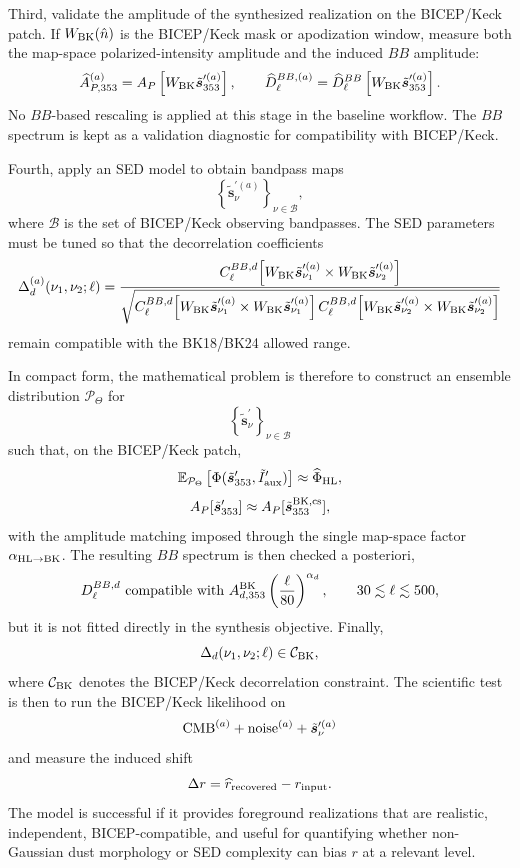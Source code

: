 \documentclass[11pt]{article}
\begin{document}
Third, validate the amplitude of the synthesized realization on the
BICEP/Keck patch.  If $W_{\rm BK}(\hat n)$ is the BICEP/Keck mask or
apodization window, measure both the map-space polarized-intensity amplitude
and the induced $BB$ amplitude:
\[
  \widehat A_{P,353}^{(a)}
  =
  A_P
  \left[
    W_{\rm BK}\tilde{\bm s}_{353}^{\prime(a)}
  \right],
  \qquad
  \widehat D_\ell^{BB,(a)}
  =
  \widehat D_\ell^{BB}
  \left[
    W_{\rm BK}\tilde{\bm s}_{353}^{\prime(a)}
  \right].
\]
No $BB$-based rescaling is applied at this stage in the baseline workflow.
The $BB$ spectrum is kept as a validation diagnostic for compatibility with
BICEP/Keck.

Fourth, apply an SED model to obtain bandpass maps
\[
  \left\{
    \tilde{\bm s}_{\nu}^{\prime(a)}
  \right\}_{\nu\in\mathcal B},
\]
where $\mathcal B$ is the set of BICEP/Keck observing bandpasses.  The SED
parameters must be tuned so that the decorrelation coefficients
\[
  \Delta_d^{(a)}(\nu_1,\nu_2;\ell)
  =
  \frac{
    C_\ell^{BB,d}
    \!\left[
      W_{\rm BK}\tilde{\bm s}_{\nu_1}^{\prime(a)}
      \times
      W_{\rm BK}\tilde{\bm s}_{\nu_2}^{\prime(a)}
    \right]
  }{
    \sqrt{
      C_\ell^{BB,d}
      \!\left[
        W_{\rm BK}\tilde{\bm s}_{\nu_1}^{\prime(a)}
        \times
        W_{\rm BK}\tilde{\bm s}_{\nu_1}^{\prime(a)}
      \right]
      C_\ell^{BB,d}
      \!\left[
        W_{\rm BK}\tilde{\bm s}_{\nu_2}^{\prime(a)}
        \times
        W_{\rm BK}\tilde{\bm s}_{\nu_2}^{\prime(a)}
      \right]
    }
  }
\]
remain compatible with the BK18/BK24 allowed range.

In compact form, the mathematical problem is therefore to construct an
ensemble distribution $\mathcal P_{\Theta}$ for
\[
  \left\{
    \tilde{\bm s}_{\nu}^{\prime}
  \right\}_{\nu\in\mathcal B}
\]
such that, on the BICEP/Keck patch,
\[
  \mathbb E_{\mathcal P_\Theta}
  \left[
    \Phi(\tilde{\bm s}_{353}^{\prime},\tilde I_{\rm aux}^{\prime})
  \right]
  \approx
  \widehat{\Phi}_{\rm HL},
\]
\[
  A_P[\tilde{\bm s}_{353}^{\prime}]
  \approx
  A_P[\tilde{\bm s}_{353}^{\rm BK,cs}],
\]
with the amplitude matching imposed through the single map-space factor
$\alpha_{\rm HL\to BK}$.  The resulting $BB$ spectrum is then checked a
posteriori,
\[
  D_\ell^{BB,d}
  \ \text{compatible with}\
  A_{d,353}^{\rm BK}
  \left(\frac{\ell}{80}\right)^{\alpha_d},
  \qquad
  30\lesssim \ell \lesssim 500,
\]
but it is not fitted directly in the synthesis objective.  Finally,
\[
  \Delta_d(\nu_1,\nu_2;\ell)
  \in
  \mathcal C_{\rm BK},
\]
where $\mathcal C_{\rm BK}$ denotes the BICEP/Keck decorrelation constraint.
The scientific test is then to run the BICEP/Keck likelihood on
\[
  {\rm CMB}^{(a)} + {\rm noise}^{(a)}
  + \tilde{\bm s}_{\nu}^{\prime(a)}
\]
and measure the induced shift
\[
  \Delta r
  =
  \widehat r_{\rm recovered}
  -
  r_{\rm input}.
\]
The model is successful if it provides foreground realizations that are
realistic, independent, BICEP-compatible, and useful for quantifying whether
non-Gaussian dust morphology or SED complexity can bias $r$ at a relevant
level.
\end{document}
